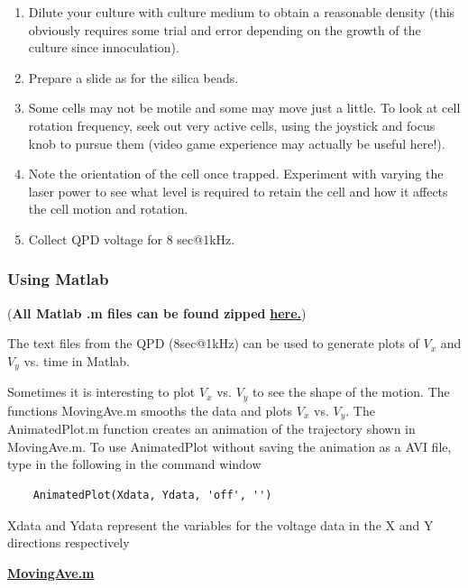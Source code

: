 \documentclass{../lab}
\begin{document}
\begin{enumerate}
    \item Dilute your culture with culture medium to obtain a reasonable density (this obviously requires some trial and error depending on the growth of the culture since innoculation).

    \item Prepare a slide as for the silica beads.

    \item Some cells may not be motile and some may move just a little. To look at cell rotation frequency, seek out very active cells, using the joystick and focus knob to pursue them (video game experience may actually be useful here!).

    \item Note the orientation of the cell once trapped. Experiment with varying the laser power to see what level is required to retain the cell and how it affects the cell motion and rotation.

    \item Collect QPD voltage for 8 sec@1kHz.

\end{enumerate}

\subsubsection{Using Matlab}

(\textbf{All Matlab .m files can be found zipped }\href{http://experimentationlab.berkeley.edu/sites/default/files/ZIP\_files/OTZ\_Matlab\_files.zip}{\textbf{here.}})

The text files from the QPD (8sec@1kHz) can be used to generate plots of $V_x$ and $V_y$ vs. time in Matlab.

Sometimes it is interesting to plot $V_x$ vs. $V_y$ to see the shape of the motion. The functions MovingAve.m smooths the data and plots $V_x$ vs. $V_y$. The AnimatedPlot.m function creates an animation of the trajectory shown in MovingAve.m. To use AnimatedPlot without saving the animation as a AVI file, type in the following in the command window
\begin{verbatim}
    AnimatedPlot(Xdata, Ydata, 'off', '')
\end{verbatim}
Xdata and Ydata represent the variables for the voltage data in the X and Y directions respectively

\href{http://experimentationlab.berkeley.edu/sites/default/files/matlab\_fitting/MovingAve.m}{\textbf{MovingAve.m}}
\end{document}
